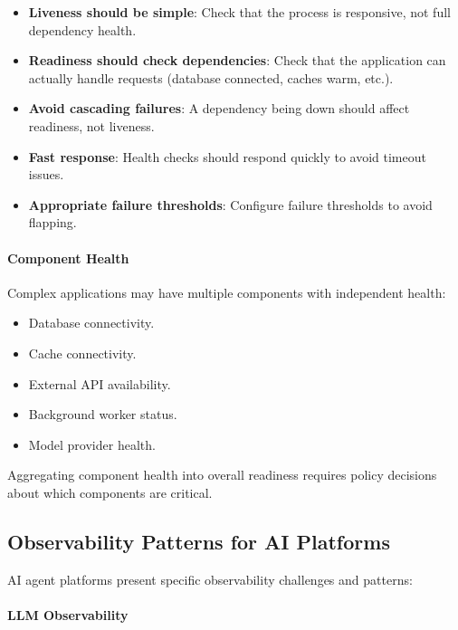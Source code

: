 \documentclass[a4paper,twoside]{sapthesis}
\begin{document}
\begin{itemize}
    \item \textbf{Liveness should be simple}: Check that the process is responsive, not full dependency health.
    
    \item \textbf{Readiness should check dependencies}: Check that the application can actually handle requests (database connected, caches warm, etc.).
    
    \item \textbf{Avoid cascading failures}: A dependency being down should affect readiness, not liveness.
    
    \item \textbf{Fast response}: Health checks should respond quickly to avoid timeout issues.
    
    \item \textbf{Appropriate failure thresholds}: Configure failure thresholds to avoid flapping.
\end{itemize}

\paragraph{Component Health}

Complex applications may have multiple components with independent health:
\begin{itemize}
    \item Database connectivity.
    \item Cache connectivity.
    \item External API availability.
    \item Background worker status.
    \item Model provider health.
\end{itemize}

Aggregating component health into overall readiness requires policy decisions about which components are critical.

\subsection{Observability Patterns for AI Platforms}

AI agent platforms present specific observability challenges and patterns:

\paragraph{LLM Observability}
\end{document}
